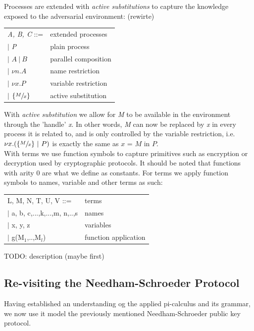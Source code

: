 Processes are extended with \textit{active substitutions} to capture the knowledge exposed to the
adversarial environment: (rewirte)
\begin{center}
	\begin{tabular} { l l }
 		\textit{A, B, C} ::= & extended processes \\ 
 		\quad $|$ \textit{P} & plain process \\  
 		\quad $|$ $A\ |\ B$ & parallel composition \\
		\quad $|$ $\nu n.A$ & name restriction \\
		\quad $|$ $\nu x.P$ & variable restriction \\
		\quad $|$ $\{ \sfrac{M}{x} \}$ & active substitution
	\end{tabular}
\end{center}
With \textit{active substitution} we allow for \textit{M} to be available in the environment through the 'handle' \textit{x}. In other words, \textit{M} can now be replaced by \textit{x} in every process it is related to, and is only controlled by the variable restriction, i.e. $\nu x.(\{\sfrac{M}{x}\}\ |\ P)$ is exactly the same as $x$ = $M$ in $P.$\\ 

With terms we use function symbols to capture primitives such as encryption or decryption used by cryptographic protocols. It should be noted that functions with arity 0 are what we define as constants.
For terms we apply function symbols to names, variable and other terms as such: 
\begin{center}
	\begin{tabular} { l l }
 		L, M, N, T, U, V ::= & terms \\ 
 		\quad $|$ a, b, c,...,k,...,m, n,..,s & names \\  
 		\quad $|$ x, y, z & variables \\
 		\quad $|$ g(M$_{1}$,..,M$_{l}$) & function application
	\end{tabular}
\end{center}
TODO: description (maybe first)

\subsection{Re-visiting the Needham-Schroeder Protocol}
Having established an understanding og the applied pi-calculus and its grammar, we now use it model the previously mentioned Needham-Schroeder public key protocol.\\

